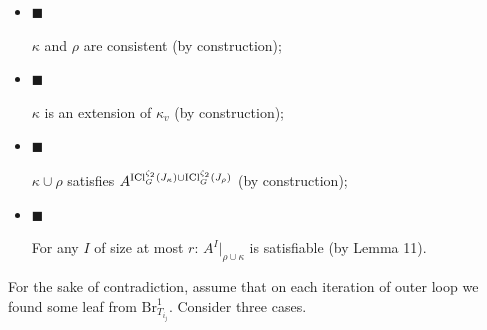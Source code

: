 \begin{itemize}


\item[] 
$\blacksquare$ 


$\kappa$ and $\rho$ are consistent (by construction);\par





\item[] 
$\blacksquare$ 


$\kappa$ is an extension of $\kappa_{v}$ (by construction);\par





\item[] 
$\blacksquare$ 


$\kappa\cup\rho$ satisfies $A^{\mathrm{ICl}_{G}^{\zeta_{2}}\left(J_{\kappa}\right)\cup\mathrm{ICl}_{G}^{%
\zeta_{2}}\left(J_{\rho}\right)}$
(by construction);\par





\item[] 
$\blacksquare$ 


For any $I$ of size at most $r$: $A^{I}|_{\rho\cup\kappa}$ is satisfiable (by Lemma
11).\par





\end{itemize}




For the sake of contradiction, assume that on each iteration of outer loop we found some leaf from
$\mathrm{Br}^{1}_{T_{i_{j}}}$. Consider three cases.\par


